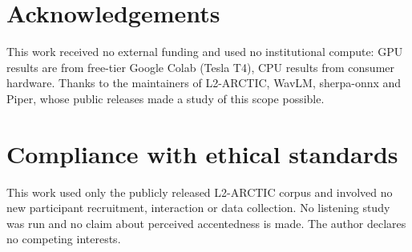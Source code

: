 \documentclass[journal]{IEEEtran}
\begin{document}
\section{Acknowledgements}

This work received no external funding and used no institutional compute: GPU
results are from free-tier Google Colab (Tesla T4), CPU results from consumer
hardware. Thanks to the maintainers of L2-ARCTIC, WavLM, sherpa-onnx and
Piper, whose public releases made a study of this scope possible.

\section{Compliance with ethical standards}

This work used only the publicly released L2-ARCTIC corpus and involved no new
participant recruitment, interaction or data collection. No listening study was
run and no claim about perceived accentedness is made. The author declares no
competing interests.



\end{document}
